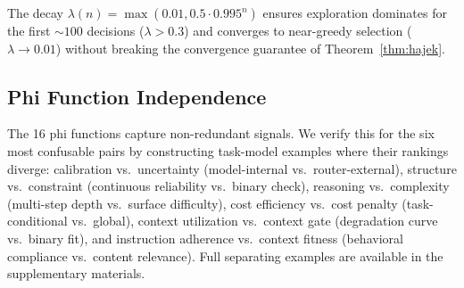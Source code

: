 \begin{proposition}
\label{prop:entropy}
The decay $\lambda(n) = \max(0.01, 0.5 \cdot 0.995^n)$ ensures exploration dominates for the first ${\sim}100$ decisions ($\lambda > 0.3$) and converges to near-greedy selection ($\lambda \to 0.01$) without breaking the convergence guarantee of Theorem~\ref{thm:hajek}.
\end{proposition}

\subsection{Phi Function Independence}

\begin{theorem}
\label{thm:orthogonality}
The 16 phi functions capture non-redundant signals. We verify this for the six most confusable pairs by constructing task-model examples where their rankings diverge: calibration vs.\ uncertainty (model-internal vs.\ router-external), structure vs.\ constraint (continuous reliability vs.\ binary check), reasoning vs.\ complexity (multi-step depth vs.\ surface difficulty), cost efficiency vs.\ cost penalty (task-conditional vs.\ global), context utilization vs.\ context gate (degradation curve vs.\ binary fit), and instruction adherence vs.\ context fitness (behavioral compliance vs.\ content relevance). Full separating examples are available in the supplementary materials.
\end{theorem}
